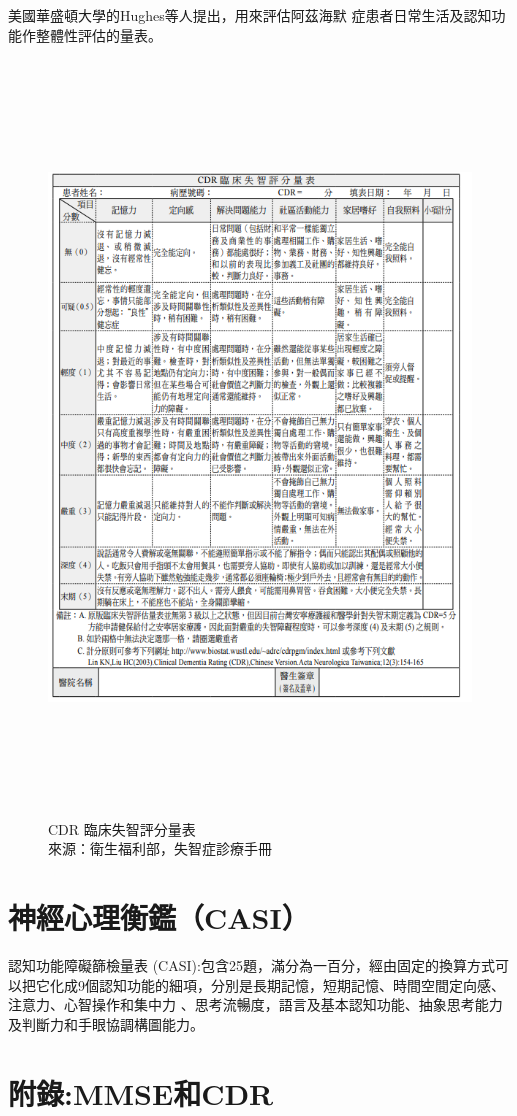 美國華盛頓大學的Hughes等人提出，用來評估阿茲海默 症患者日常生活及認知功能作整體性評估的量表。

\begin{figure}[H]
	\centerline{\includegraphics[height=20cm]{pic/CDR.PNG}}
	\caption{CDR 臨床失智評分量表\\來源：衛生福利部，失智症診療手冊}
	
	\label{fig:CDR}
\end{figure}




\section{神經心理衡鑑（CASI）}
認知功能障礙篩檢量表 (CASI):包含25題，滿分為一百分，經由固定的換算方式可以把它化成9個認知功能的細項，分別是長期記憶，短期記憶、時間空間定向感、注意力、心智操作和集中力 、思考流暢度，語言及基本認知功能、抽象思考能力及判斷力和手眼協調構圖能力。


\section{附錄:MMSE和CDR}





